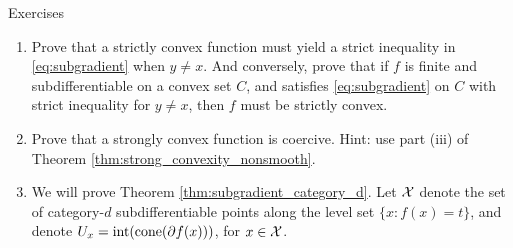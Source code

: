 \begin{xcb}{Exercises}
\begin{enumerate}[label=\thechapter.\arabic*]
\begin{enumerate}[label=\alph*.]
\item Apply Rockafellar's embedding theorem and the closedness of $f$ to
  conclude $g$ is convex, and as $x,v$ were arbitrary, $f_m$ itself must be
  convex. Hint: by the embedding theorem, we know that $T \subseteq \partial h$
  for some closed convex function $h$. Rewrite this containment as 
  \[
  \partial g(x) \subseteq \partial h(x) + m(x+vt), \quad \text{for all $x$}.
  \]
  Now use closedness of $g$ and \eqref{eq:embedding_equality} to prove that $g$
  is convex. 
\end{enumerate}

\item \label{ex:strict_convexity_subgradient} 
  Prove that a strictly convex function must yield a strict inequality in
  \eqref{eq:subgradient} when $y \not= x$. And conversely, prove that if $f$
  is finite and subdifferentiable on a convex set $C$, and satisfies
  \eqref{eq:subgradient} on $C$ with strict inequality for $y \not =x$, then $f$
  must be strictly convex.    

\item \label{ex:strong_convexity_coercive}
  Prove that a strongly convex function is coercive. Hint: use part (iii) of
  Theorem \ref{thm:strong_convexity_nonsmooth}.  




\item \label{ex:subgradient_category_d}
  We will prove Theorem \ref{thm:subgradient_category_d}. Let $\mathcal{X}$ denote the
  set of category-$d$ subdifferentiable points along the level set $\{x : f(x) =
  t\}$, and denote $U_x = \operatorname{int}(\operatorname{cone}(\partial f(x)))$, for $x \in \mathcal{X}$. 


\end{enumerate}
\end{xcb}
